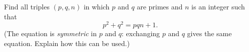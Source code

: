 Find all triples $(p,q,n)$ in which $p$ and $q$ are primes and $n$ is an integer such that
\[p^2+q^2=pqn+1.\]
(The equation is \emph{symmetric} in $p$ and $q$: exchanging $p$ and $q$ gives the same equation. Explain how this can be used.)
